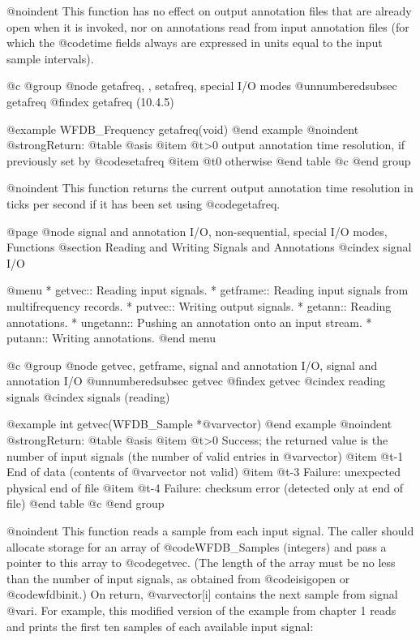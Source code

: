 {{{{{{{{@noindent
This function has no effect on output annotation files that are already open
when it is invoked, nor on annotations read from input annotation files
(for which the @code{time} fields always are expressed in units equal to
the input sample intervals).

@c @group
@node     getafreq, , setafreq, special I/O modes
@unnumberedsubsec getafreq
@findex getafreq (10.4.5)

@example
WFDB_Frequency getafreq(void)
@end example
@noindent
@strong{Return:}
@table @asis
@item @t{>0}
output annotation time resolution, if previously set by @code{setafreq}
@item @t{0}
otherwise
@end table
@c @end group

@noindent
This function returns the current output annotation time resolution
in ticks per second if it has been set using @code{getafreq}.

@page
@node     signal and annotation I/O, non-sequential, special I/O modes, Functions
@section Reading and Writing Signals and Annotations
@cindex signal I/O

@menu
* getvec::		Reading input signals.
* getframe::            Reading input signals from multifrequency records.
* putvec::		Writing output signals.
* getann::		Reading annotations.
* ungetann::		Pushing an annotation onto an input stream.
* putann::		Writing annotations.
@end menu

@c @group
@node    getvec, getframe, signal and annotation I/O, signal and annotation I/O
@unnumberedsubsec getvec
@findex getvec
@cindex reading signals
@cindex signals (reading)

@example
int getvec(WFDB_Sample *@var{vector})
@end example
@noindent
@strong{Return:}
@table @asis
@item @t{>0}
Success;  the returned value is the number of input signals (the number of
valid entries in @var{vector})
@item @t{-1}
End of data (contents of @var{vector} not valid)
@item @t{-3}
Failure: unexpected physical end of file
@item @t{-4}
Failure: checksum error (detected only at end of file)
@end table
@c @end group

@noindent
This function reads a sample from each input signal.  The caller should
allocate storage for an array of @code{WFDB_Sample}s (integers) and pass a
pointer to this array to @code{getvec}.  (The length of the array must
be no less than the number of input signals, as obtained from
@code{isigopen} or @code{wfdbinit}.)  On return, @var{vector[i]}
contains the next sample from signal @var{i}.  For example, this
modified version of the example from chapter 1 reads and prints the
first ten samples of each available input signal:

}}}}}}}}
